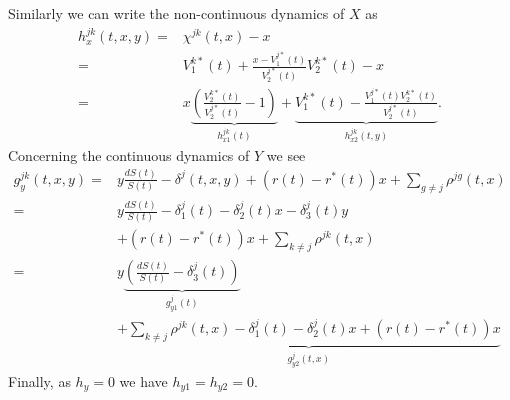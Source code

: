 \documentclass[12pt]{article}
\theoremstyle{my_thm}
\begin{document}
Similarly we can write the non-continuous dynamics of $X$ as 
\begin{align*}
h^{jk}_x(t,x,y)=&\chi^{jk}(t,x) -x
\\
=&
V^{k*}_1(t) + \frac{x-V^{j*}_1(t)}{V^{j*}_2(t)}V^{k*}_2(t) -x
\\
=&
x
\underbrace{\left( \frac{V^{k*}_2(t)}{V^{j*}_2(t)}-1 \right)}_{h^{jk}_{x1}(t)}+\underbrace{V^{k*}_1(t) - \frac{V^{j*}_1(t)V^{k*}_2(t)}{V^{j*}_2(t)}}_{h^{jk}_{x2}(t,y)}.
\end{align*}
Concerning the continuous dynamics of $Y$ we see
\begin{align*}
g^{jk}_y(t,x,y)=&y \frac{dS(t)}{S(t)} - \delta^j(t,x,y) + (r(t)-r^*(t)) x + \sum_{g \neq j} \rho^{jg}(t,x) 
\\
=&y\frac{dS(t)}{S(t)} - \delta_1^j(t)-\delta_2^j(t)x-\delta_3^j(t)y
\\
&+ (r(t)-r^*(t)) x
+\sum_{k \neq j} \rho^{jk}(t,x)
\\
=& y \underbrace{\left( \frac{dS(t)}{S(t)}-\delta_3^j(t)\right)
}_{g^j_{y1}(t)}\\
& \underbrace{+\sum_{k \neq j} \rho^{jk}(t,x)- \delta_1^j(t)-\delta_2^j(t)x
+ (r(t)-r^*(t)) x }_{g^j_{y2}(t,x)}
\end{align*}
Finally, as $h_y=0$ we have $h_{y1}=h_{y2}=0$. 

\newpage


\end{document}
